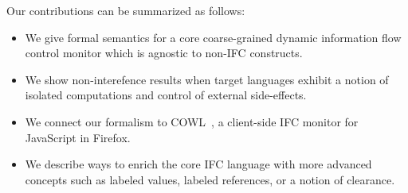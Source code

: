 

Our contributions can be summarized as follows:
\begin{itemize}
  \item We give formal semantics for a core coarse-grained dynamic information
    flow control monitor which is agnostic to non-IFC constructs.
  \item We show non-interefence results when target languages exhibit a notion
    of isolated computations and control of external side-effects.
  \item
  We connect our formalism to COWL~\cite{swapi}, a
  client-side IFC monitor for JavaScript in Firefox.
  \item We describe ways to enrich the core IFC language with
  more advanced concepts such as labeled values, labeled references, or a
  notion of clearance. %
\end{itemize}

